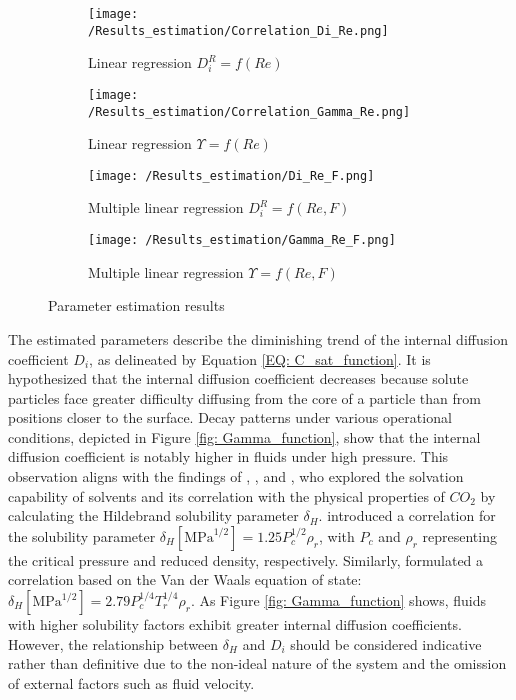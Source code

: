 \documentclass[../Supercritical_fluid_extraction_of_essential_oil_from_chamomile.tex]{subfiles}
\begin{document}
	\begin{figure*}[!h]
		\centering
		\begin{subfigure}{0.24\textwidth}
			\centering
			\texttt{[image: /Results\_estimation/Correlation\_Di\_Re.png]}
			\caption{Linear regression $D_i^R = f(Re)$}
			\label{fig: Correlations_Di_Re}
		\end{subfigure}
		\hfill
		\begin{subfigure}{0.24\textwidth}
			\centering
			\texttt{[image: /Results\_estimation/Correlation\_Gamma\_Re.png]}
			\caption{Linear regression $\Upsilon = f(Re)$}
			\label{fig: Correlations_Gamma_Re}
		\end{subfigure}
		\hfill
		\begin{subfigure}{0.24\textwidth}
			\centering
			\texttt{[image: /Results\_estimation/Di\_Re\_F.png]}
			\caption{Multiple linear regression $D_i^R = f(Re, F)$}
			\label{fig: Correlations_Di_Re_F}
		\end{subfigure}
		\hfill
		\begin{subfigure}{0.24\textwidth}
			\centering
			\texttt{[image: /Results\_estimation/Gamma\_Re\_F.png]}
			\caption{Multiple linear regression $\Upsilon = f(Re, F)$}
			\label{fig: Correlations_Gamma_Re_F}
		\end{subfigure}
		\caption{Parameter estimation results}
	\end{figure*}
		
	\iffalse
	The estimated parameters describe the diminishing trend of the internal diffusion coefficient $D_i$, as delineated by Equation \ref{EQ: C_sat_function}. It is hypothesized that the internal diffusion coefficient decreases because solute particles face greater difficulty diffusing from the core of a particle than from positions closer to the surface. Decay patterns under various operational conditions, depicted in Figure \ref{fig: Gamma_function}, show that the internal diffusion coefficient is notably higher in fluids under high pressure. This observation aligns with the findings of \citet{Giddings1968}, \citet{Gurdial1989}, and \citet{Machida2011}, who explored the solvation capability of solvents and its correlation with the physical properties of $CO_2$ by calculating the Hildebrand solubility parameter $\delta_H$. \citet{Giddings1968} introduced a correlation for the solubility parameter $\delta_H[\text{MPa}^{1/2}] = 1.25 P_c^{1/2}\rho_r$, with $P_c$ and $\rho_r$ representing the critical pressure and reduced density, respectively. Similarly, \citet{Marcus2006} formulated a correlation based on the Van der Waals equation of state: $\delta_H[\text{MPa}^{1/2}] = 2.79 P_c^{1/4}T_r^{1/4}\rho_r$. As Figure \ref{fig: Gamma_function} shows, fluids with higher solubility factors exhibit greater internal diffusion coefficients. However, the relationship between $\delta_H$ and $D_i$ should be considered indicative rather than definitive due to the non-ideal nature of the system and the omission of external factors such as fluid velocity.
	
\end{document}
